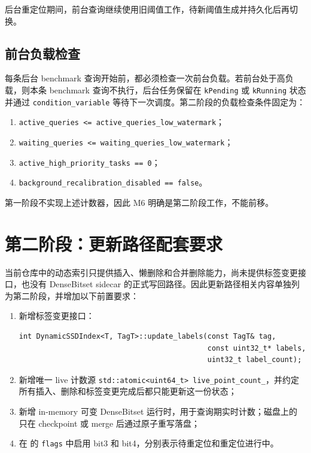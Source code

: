 \documentclass[UTF8]{ctexart}
\begin{document}
后台重定位期间，前台查询继续使用旧阈值工作，待新阈值生成并持久化后再切换。

\subsection{前台负载检查}
每条后台 benchmark 查询开始前，都必须检查一次前台负载。若前台处于高负载，则本条 benchmark 查询不执行，后台任务保留在 \texttt{kPending} 或 \texttt{kRunning} 状态并通过 \texttt{condition\_variable} 等待下一次调度。第二阶段的负载检查条件固定为：

\begin{enumerate}
\item \texttt{active\_queries <= active\_queries\_low\_watermark}；
\item \texttt{waiting\_queries <= waiting\_queries\_low\_watermark}；
\item \texttt{active\_high\_priority\_tasks == 0}；
\item \texttt{background\_recalibration\_disabled == false}。
\end{enumerate}

第一阶段不实现上述计数器，因此 M6 明确是第二阶段工作，不能前移。

\section{第二阶段：更新路径配套要求}
当前仓库中的动态索引只提供插入、懒删除和合并删除能力，尚未提供标签变更接口，也没有 DenseBitset sidecar 的正式写回路径。因此更新路径相关内容单独列为第二阶段，并增加以下前置要求：

\begin{enumerate}
\item 新增标签变更接口：
\begin{verbatim}
int DynamicSSDIndex<T, TagT>::update_labels(const TagT& tag,
											const uint32_t* labels,
											uint32_t label_count);
\end{verbatim}
\item 新增唯一 live 计数源 \texttt{std::atomic<uint64\_t> live\_point\_count\_}，并约定所有插入、删除和标签变更完成后都只能更新这一份状态；
\item 新增 in-memory 可变 DenseBitset 运行时，用于查询期实时计数；磁盘上的  只在 checkpoint 或 merge 后通过原子重写落盘；
\item 在  的 \texttt{flags} 中启用 bit3 和 bit4，分别表示待重定位和重定位进行中。
\end{enumerate}
\end{document}
